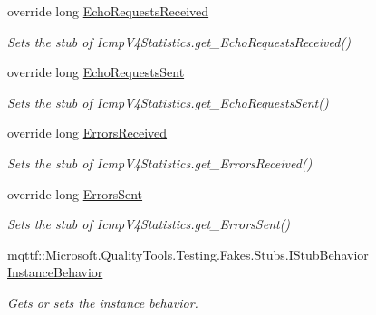 \begin{DoxyCompactItemize}
override long \hyperlink{class_system_1_1_net_1_1_network_information_1_1_fakes_1_1_stub_icmp_v4_statistics_a7c8042bb5cfee7fca7da08e48201c862}{Echo\-Requests\-Received}
\begin{DoxyCompactList}\small\item\em Sets the stub of Icmp\-V4\-Statistics.\-get\-\_\-\-Echo\-Requests\-Received()\end{DoxyCompactList}\item 
override long \hyperlink{class_system_1_1_net_1_1_network_information_1_1_fakes_1_1_stub_icmp_v4_statistics_ae5402404a2d84254ed2d21bb10783523}{Echo\-Requests\-Sent}
\begin{DoxyCompactList}\small\item\em Sets the stub of Icmp\-V4\-Statistics.\-get\-\_\-\-Echo\-Requests\-Sent()\end{DoxyCompactList}\item 
override long \hyperlink{class_system_1_1_net_1_1_network_information_1_1_fakes_1_1_stub_icmp_v4_statistics_aa8f957f35168b4c4cc37d53318cbd41b}{Errors\-Received}
\begin{DoxyCompactList}\small\item\em Sets the stub of Icmp\-V4\-Statistics.\-get\-\_\-\-Errors\-Received()\end{DoxyCompactList}\item 
override long \hyperlink{class_system_1_1_net_1_1_network_information_1_1_fakes_1_1_stub_icmp_v4_statistics_aa3eda348d0595506d815f4b8ea6068bb}{Errors\-Sent}
\begin{DoxyCompactList}\small\item\em Sets the stub of Icmp\-V4\-Statistics.\-get\-\_\-\-Errors\-Sent()\end{DoxyCompactList}\item 
mqttf\-::\-Microsoft.\-Quality\-Tools.\-Testing.\-Fakes.\-Stubs.\-I\-Stub\-Behavior \hyperlink{class_system_1_1_net_1_1_network_information_1_1_fakes_1_1_stub_icmp_v4_statistics_ac3175a7ff0925526808d301a0dcdfd21}{Instance\-Behavior}
\begin{DoxyCompactList}\small\item\em Gets or sets the instance behavior.\end{DoxyCompactList}\item 

\end{DoxyCompactItemize}
